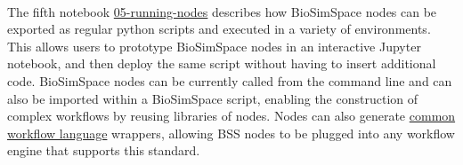 \\
%
The fifth notebook \href{https://github.com/OpenBioSim/BioSimSpaceTutorials/blob/main/01_introduction/05_running_nodes.ipynb}{05-running-nodes} describes how BioSimSpace nodes can be exported as regular python scripts and executed in a variety of environments. This allows users to prototype BioSimSpace nodes in an interactive Jupyter notebook, and then deploy the same script without having to insert additional code. BioSimSpace nodes can be currently called from the command line and can also be imported within a BioSimSpace script, enabling the construction of complex workflows by reusing libraries of nodes. Nodes can also generate \href{https://www.commonwl.org}{common workflow language} wrappers, allowing BSS nodes to be plugged into any workflow engine that supports this standard. 
\\
